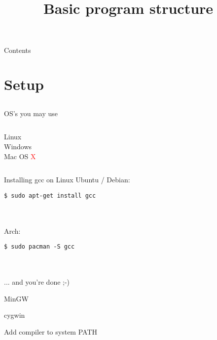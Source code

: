 
\usepackage{ulem}

\newcommand{\topic}{
    Basic program structure
}


\title{\topic}
\supertitle{\course}
\date{}



\maketitle

\begin{frame}{Contents}
	\tableofcontents
\end{frame}

\section{Setup}
\subsection{}
\begin{frame}{OS's you may use}
	\begin{columns}[T]
		Linux\\
		\uncover<2->{\textcolor{green}{recommended}}
		Windows\\
		\uncover<3->{\textcolor{orange}{supported}}
		Mac OS \textcolor<4->{red}{X}
	\end{columns}
\end{frame}
\begin{frame}[fragile]{Installing gcc on Linux}
	Ubuntu / Debian: 
	\begin{lstlisting}[numbers=none]
$ sudo apt-get install gcc
\end{lstlisting} \ \\ \ \\
	Arch:
	\begin{lstlisting}[numbers=none]
$ sudo pacman -S gcc
\end{lstlisting} \ \\ \ \\
	... and you're done ;-)
\end{frame}

\begin{frame}{MinGW}
	
\end{frame}
\begin{frame}{cygwin}
	
\end{frame}
\begin{frame}{Add compiler to system PATH}
	
\end{frame}

